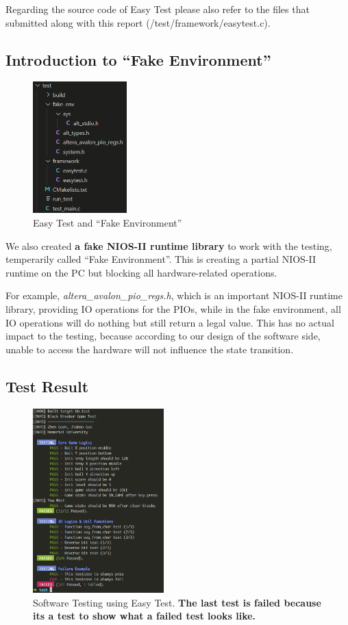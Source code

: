 \documentclass[conference]{IEEEtran}
\begin{document}
Regarding the source code of Easy Test please also refer to the files that submitted along with this report (/test/framework/easytest.c).

\subsection{Introduction to ``Fake Environment''}
\begin{figure}[h] %
    \centering
    \includegraphics[height=2in]{imageset/test}
    \caption{Easy Test and ``Fake Environment''}
    \label{fig_sim2}
\end{figure}


We also created \textbf{a fake NIOS-II runtime library} to work with the testing, temperarily called ``Fake Environment''. This is creating a partial NIOS-II runtime on the PC but blocking all hardware-related operations. 

For example, \emph{altera\_avalon\_pio\_regs.h}, which is an important NIOS-II runtime library, providing IO operations for the PIOs, while in the fake environment, all IO operations will do nothing but still return a legal value. This has no actual impact to the testing, because according to our design of the software side, unable to access the hardware will not influence the state transition.


\subsection{Test Result}
\begin{figure}[h] %
    \centering
    \includegraphics[width=0.45\textwidth]{imageset/test2}
    \caption{
        Software Testing using Easy Test. \textbf{The last test is failed because its a test to show what a failed test looks like.}
    }
    \label{fig_sim3}
\end{figure}
\end{document}
